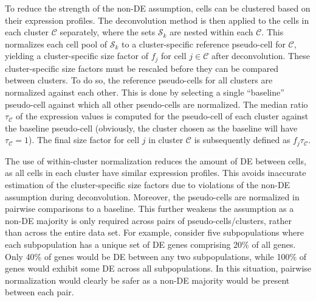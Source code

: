 \documentclass{bmcart}
\newcommand{\revised}[1]{#1}
\begin{document}
To reduce the strength of the non-DE assumption, cells can be clustered based on their expression profiles.
The deconvolution method is then applied to the cells in each cluster $\mathcal{C}$ separately,
    where the sets $\mathcal{S}_k$ are nested within each $\mathcal{C}$.
This normalizes each cell pool of $\mathcal{S}_k$ to a cluster-specific reference pseudo-cell for $\mathcal{C}$,
    yielding a cluster-specific size factor of $f_{j}$ for cell $j \in \mathcal{C}$ after deconvolution.
These cluster-specific size factors must be rescaled before they can be compared between clusters.
To do so, the reference pseudo-cells for all clusters are normalized against each other.
This is done by selecting a single ``baseline'' pseudo-cell against which all other pseudo-cells are normalized.
The median ratio $\tau_{\mathcal{C}}$ of the expression values is computed for the pseudo-cell of each cluster against the baseline pseudo-cell
    (obviously, the cluster chosen as the baseline will have $\tau_{\mathcal{C}}=1$).
The \revised{final} size factor for cell $j$ in cluster $\mathcal{C}$ is subsequently defined as $f_{j}\tau_{\mathcal{C}}$.


The use of within-cluster normalization reduces the amount of DE between cells, as all cells in each cluster have similar expression profiles.
This avoids inaccurate estimation of the \revised{cluster-specific} size factors due to violations of the non-DE assumption \revised{during deconvolution}.
Moreover, the pseudo-cells are normalized in pairwise comparisons to a baseline.
This \revised{further} weakens the assumption as a non-DE majority is only required across pairs of pseudo-cells/clusters, rather than across the entire data set.
For example, consider five subpopulations where each \revised{subpopulation} has a unique set of DE genes comprising 20\% of all genes.
Only 40\% of genes would be DE between any two subpopulations, while 100\% of genes would exhibit some DE across all subpopulations.
In this situation, pairwise normalization would clearly be safer as a non-DE majority would be present \revised{between each pair}.
\end{document}
